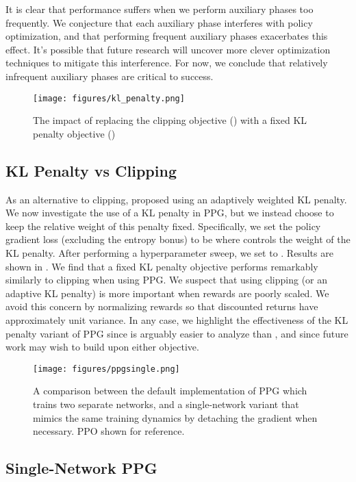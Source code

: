 \documentclass{article}
\begin{document}
It is clear that performance suffers when we perform auxiliary phases too frequently. We conjecture that each auxiliary phase interferes with policy optimization, and that performing frequent auxiliary phases exacerbates this effect. It's possible that future research will uncover more clever optimization techniques to mitigate this interference. For now, we conclude that relatively infrequent auxiliary phases are critical to success.

\begin{figure*}
\centering
\texttt{[image: figures/kl\_penalty.png]}
\caption{The impact of replacing the clipping objective () with a fixed KL penalty objective ()}
\label{fig:kl_penalty}
\end{figure*}

\subsection{KL Penalty vs Clipping}

As an alternative to clipping, \cite{ppo} proposed using an adaptively weighted KL penalty. We now investigate the use of a KL penalty in PPG, but we instead choose to keep the relative weight of this penalty fixed. Specifically, we set the policy gradient loss (excluding the entropy bonus) to be  where  controls the weight of the KL penalty. After performing a hyperparameter sweep, we set  to . Results are shown in . We find that a fixed KL penalty objective performs remarkably similarly to clipping when using PPG. We suspect that using clipping (or an adaptive KL penalty) is more important when rewards are poorly scaled. We avoid this concern by normalizing rewards so that discounted returns have approximately unit variance. In any case, we highlight the effectiveness of the KL penalty variant of PPG since  is arguably easier to analyze than , and since future work may wish to build upon either objective.

\begin{figure*}
\centering
\texttt{[image: figures/ppgsingle.png]}
\caption{A comparison between the default implementation of PPG which trains two separate networks, and a single-network variant that mimics the same training dynamics by detaching the gradient when necessary. PPO shown for reference.}
\label{fig:detach}
\end{figure*}

\subsection{Single-Network PPG}
\end{document}
